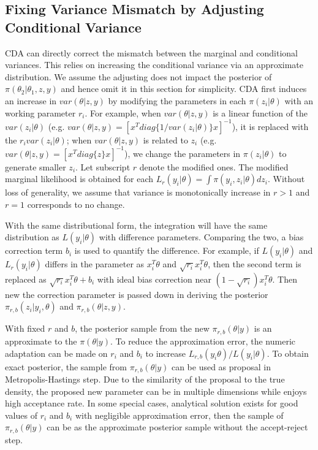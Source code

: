 \documentclass[10pt]{article}
\begin{document}
\subsection{Fixing Variance Mismatch by Adjusting Conditional Variance}

CDA can directly correct the mismatch between the marginal and conditional variances. This relies on increasing the conditional variance via an approximate distribution. We assume the adjusting does not impact the posterior of $\pi(\theta_2|\theta_1,z,y)$ and hence omit it in this section for simplicity. CDA first induces an increase in $var(\theta|z,y)$ by modifying the parameters in each $\pi(z_i|\theta)$ with an working parameter $r_i$. For example,  when $var(\theta|z,y)$ is a linear function of the $var(z_i|\theta)$ (e.g. $var(\theta|z,y)= [ x^{T} diag \{ 1/ var(z_i|\theta)\}x ]^{-1}$), it is replaced with the $r_i  var(z_i|\theta)$; when $var(\theta|z,y)$ is related to $z_i$  (e.g.  $var(\theta|z,y)= [ x^{T} diag \{z\}x ]^{-1}$), we change the parameters in $\pi(z_i|\theta)$ to generate smaller $z_i$. Let subscript $r$ denote the modified ones. The modified marginal likelihood is obtained for each $L_r(y_i|\theta)= \int \pi(y_i, z_i | \theta) d z_i$. Without loss of generality, we assume that variance is monotonically increase in $r>1$ and $r=1$ corresponds to no change. 

With the same distributional form, the integration will have the same distribution as $L(y_i|\theta)$ with difference parameters. Comparing the two, a bias correction term $b_i$ is used to quantify the difference. For example, if $L(y_i|\theta)$ and $L_r(y_i|\theta)$ differs in the parameter as $x_i^T\theta$ and  $\sqrt{r_i} x_i^T\theta$, then the second term is replaced as $\sqrt{r_i} x_i^T\theta+ b_i$ with  ideal bias correction  near $(1-\sqrt{r_i}) x_i^T\theta$. Then new the correction parameter is passed down in deriving the posterior $\pi_{r,b}( z_i | y_i, \theta )$ and $\pi_{r,b}( \theta |z,y)$.

With fixed $r$ and $b$, the posterior sample from the new $\pi_{r,b}(\theta|y)$ is an approximate to the $\pi(\theta|y)$. To reduce the approximation error, the numeric adaptation can be made on $r_i$ and $b_i$ to increase $L_{r,b}(y_i\theta)/L(y_i|\theta)$. To obtain exact posterior, the sample from $\pi_{r,b}(\theta|y)$ can be used as proposal in Metropolis-Hastings step. Due to the similarity of the proposal to the true density, the proposed new parameter can be in multiple dimensions while enjoys high acceptance rate. In some special cases, analytical solution exists for good values of $r_i$ and $b_i$ with negligible approximation error, then the sample of $\pi_{r,b}(\theta|y)$ can be as the approximate posterior sample without the accept-reject step.
\end{document}
